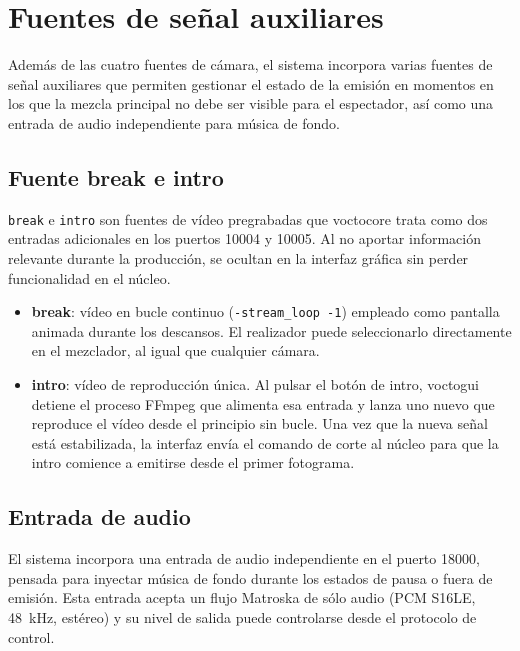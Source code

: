 \section{Fuentes de señal auxiliares}
\label{sec:fuentes_auxiliares}

Además de las cuatro fuentes de cámara, el sistema incorpora varias fuentes de señal
auxiliares que permiten gestionar el estado de la emisión en momentos en los que la
mezcla principal no debe ser visible para el espectador, así como una entrada de audio
independiente para música de fondo.

\subsection{Fuente break e intro}

\texttt{break} e \texttt{intro} son fuentes de vídeo pregrabadas que voctocore trata
como dos entradas adicionales en los puertos 10004 y 10005. Al no aportar información
relevante durante la producción, se ocultan en la interfaz gráfica sin perder
funcionalidad en el núcleo.

\begin{itemize}
  \item \textbf{break}: vídeo en bucle continuo (\texttt{-stream\_loop -1}) empleado
        como pantalla animada durante los descansos. El realizador puede seleccionarlo
        directamente en el mezclador, al igual que cualquier cámara.
  \item \textbf{intro}: vídeo de reproducción única. Al pulsar el botón de intro,
        voctogui detiene el proceso FFmpeg que alimenta esa entrada y lanza uno nuevo
        que reproduce el vídeo desde el principio sin bucle. Una vez que la nueva
        señal está estabilizada, la interfaz envía el comando de corte al núcleo para
        que la intro comience a emitirse desde el primer fotograma.
\end{itemize}

\subsection{Entrada de audio}

El sistema incorpora una entrada de audio independiente en el puerto 18000, pensada
para inyectar música de fondo durante los estados de pausa o fuera de emisión. Esta
entrada acepta un flujo Matroska de sólo audio (PCM S16LE, 48~kHz, estéreo) y su
nivel de salida puede controlarse desde el protocolo de control.

